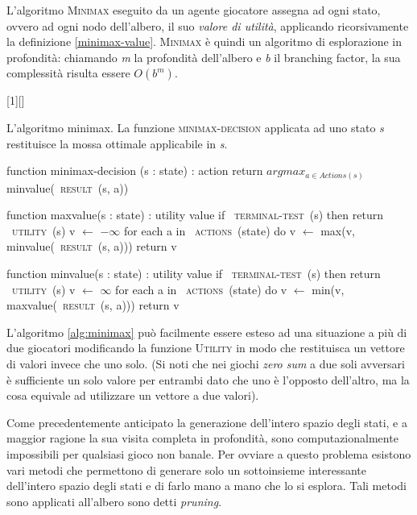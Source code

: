 L'algoritmo \textsc{Minimax} eseguito da un agente giocatore assegna ad ogni stato, ovvero ad ogni nodo dell'albero, il suo \emph{valore di utilità}, applicando ricorsivamente la definizione \ref{minimax-value}.
\textsc{Minimax} è quindi un algoritmo di esplorazione in profondità: chiamando \emph{m} la profondità dell'albero e \emph{b} il branching factor, la sua complessità risulta essere $O(b^m)$.



[1][]
{}
{}

\begin{algorithm}
\caption{L'algoritmo minimax. La funzione \textsc{minimax-decision} applicata ad uno stato \emph{s} restituisce la mossa ottimale applicabile in \emph{s}. \cite{randw}}
\label{alg:minimax}
\begin{PseudoCode}[mathescape,escapechar=~]
function minimax-decision (s : state) : action
   return $argmax_{a \in Actions(s)}$ minvalue(~\textsc{result}~(s, a))

function maxvalue(s : state) : utility value
   if ~\textsc{terminal-test}~(s) then return ~\textsc{utility}~(s)
   v $ \leftarrow $ $ - \infty $
   for each a in ~\textsc{actions}~(state) do
      v $ \leftarrow $ max(v, minvalue(~\textsc{result}~(s, a)))
   return v
   
function minvalue(s : state) : utility value
   if ~\textsc{terminal-test}~(s) then return ~\textsc{utility}~(s)
   v $ \leftarrow $ $ \infty $
   for each a in ~\textsc{actions}~(state) do
      v $ \leftarrow $ min(v, maxvalue(~\textsc{result}~(s, a)))
   return v
\end{PseudoCode}

\end{algorithm}

L'algoritmo \ref{alg:minimax} può facilmente essere esteso ad una situazione a più di due giocatori modificando la funzione \textsc{Utility} in modo che restituisca un vettore di valori invece che uno solo.
(Si noti che nei giochi \emph{zero sum} a due soli avversari è sufficiente un solo valore per entrambi dato che uno è l'opposto dell'altro, ma la cosa equivale ad utilizzare un vettore a due valori).

Come precedentemente anticipato la generazione dell'intero spazio degli stati, e a maggior ragione la sua visita completa in profondità, sono computazionalmente impossibili per qualsiasi gioco non banale.
Per ovviare a questo problema esistono vari metodi che permettono di generare solo un sottoinsieme interessante dell'intero spazio degli stati e di farlo mano a mano che lo si esplora. Tali metodi sono applicati all'albero sono detti \emph{pruning}.

